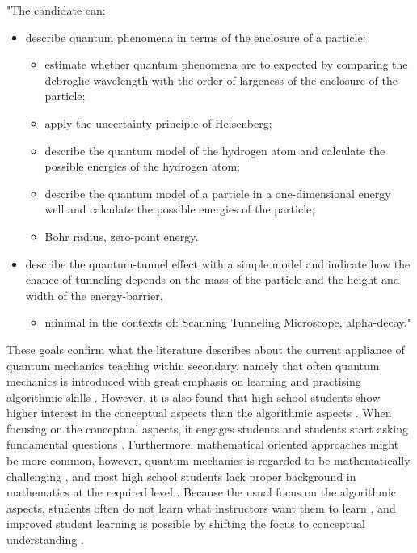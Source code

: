 \documentclass[11pt,twoside]{report} %
\begin{document}
"The candidate can:
\begin{itemize}
\item describe quantum phenomena in terms of the enclosure of a particle:
\begin{itemize}
\item estimate whether quantum phenomena are to expected by comparing the debroglie-wavelength with the order of largeness of the enclosure of the particle;
\item apply the uncertainty principle of Heisenberg;
\item describe the quantum model of the hydrogen atom and calculate the possible energies of the hydrogen atom;
\item describe the quantum model of a particle in a one-dimensional energy well and calculate the possible energies of the particle;
\item Bohr radius, zero-point energy.
\end{itemize}
\item describe the quantum-tunnel effect with a simple model and indicate how the chance of tunneling depends on the mass of the particle and the height and width of the energy-barrier,
\begin{itemize}
\item minimal in the contexts of: Scanning Tunneling Microscope, alpha-decay."
\end{itemize} 
\end{itemize}

These goals confirm what the literature describes about the current appliance of quantum mechanics teaching within secondary, namely that often quantum mechanics is introduced with great emphasis on learning and practising algorithmic skills \cite{papaphotis1,papaphotis2}. However, it is also found that high school students show higher interest in the conceptual aspects than the algorithmic aspects \cite{papaphotis1,papaphotis2,levrini}. When focusing on the conceptual aspects, it engages students \cite{henriksen} and students start asking fundamental questions \cite{mckagan}. Furthermore, mathematical oriented approaches might be more common, however, quantum mechanics is regarded to be mathematically challenging \cite{gianino, mckagan}, and most high school students lack proper background in mathematics at the required level \cite{dori}. Because the usual focus on the algorithmic aspects, students often do not learn what instructors want them to learn \cite{asikainen, mckagan}, and improved student learning is possible by shifting the focus to conceptual understanding \cite{mckagan}.
\end{document}
